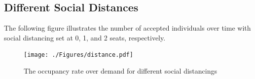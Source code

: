 
\subsection*{Different Social Distances}
The following figure illustrates the number of accepted individuals over time with social distancing set at 0, 1, and 2 seats, respectively.

\begin{figure}[h]
  \centering
    \texttt{[image: ./Figures/distance.pdf]}
  \caption{The occupancy rate over demand for different social distancings}
\end{figure}










